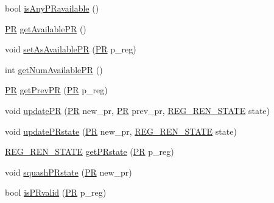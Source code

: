\begin{DoxyCompactItemize}
bool \hyperlink{classo3__registerRename_a500dec17b068c33a1813786cb6727273}{isAnyPRavailable} ()
\item 
\hyperlink{global_2global_8h_a54dcae2ba04c76c12afe113b706bd4dc}{PR} \hyperlink{classo3__registerRename_a314a54fa930b7fa3de55c8b66e46061b}{getAvailablePR} ()
\item 
void \hyperlink{classo3__registerRename_aae9d93d826236d42ba090d1d53ba62af}{setAsAvailablePR} (\hyperlink{global_2global_8h_a54dcae2ba04c76c12afe113b706bd4dc}{PR} p\_\-reg)
\item 
int \hyperlink{classo3__registerRename_af3dacac6db9095e6aa73da550e2c71bc}{getNumAvailablePR} ()
\item 
\hyperlink{global_2global_8h_a54dcae2ba04c76c12afe113b706bd4dc}{PR} \hyperlink{classo3__registerRename_ab76f162d8e2a6228404670bda2bad322}{getPrevPR} (\hyperlink{global_2global_8h_a54dcae2ba04c76c12afe113b706bd4dc}{PR} p\_\-reg)
\item 
void \hyperlink{classo3__registerRename_a6e6d2444676ba95b85d0a84908f6e5fe}{updatePR} (\hyperlink{global_2global_8h_a54dcae2ba04c76c12afe113b706bd4dc}{PR} new\_\-pr, \hyperlink{global_2global_8h_a54dcae2ba04c76c12afe113b706bd4dc}{PR} prev\_\-pr, \hyperlink{global_2global_8h_aa58e77d5a6caaeed4d4bd6f5b30f3ee7}{REG\_\-REN\_\-STATE} state)
\item 
void \hyperlink{classo3__registerRename_a6e6c35b5b477597e3eafed6def8c574b}{updatePRstate} (\hyperlink{global_2global_8h_a54dcae2ba04c76c12afe113b706bd4dc}{PR} new\_\-pr, \hyperlink{global_2global_8h_aa58e77d5a6caaeed4d4bd6f5b30f3ee7}{REG\_\-REN\_\-STATE} state)
\item 
\hyperlink{global_2global_8h_aa58e77d5a6caaeed4d4bd6f5b30f3ee7}{REG\_\-REN\_\-STATE} \hyperlink{classo3__registerRename_a62accbd82ef62f8c411975e824d644af}{getPRstate} (\hyperlink{global_2global_8h_a54dcae2ba04c76c12afe113b706bd4dc}{PR} p\_\-reg)
\item 
void \hyperlink{classo3__registerRename_aebbf6e056ef5e4c50081db9dc1817a2b}{squashPRstate} (\hyperlink{global_2global_8h_a54dcae2ba04c76c12afe113b706bd4dc}{PR} new\_\-pr)
\item 
bool \hyperlink{classo3__registerRename_a66e4f1bfb4aef291e88933aad6c46ce6}{isPRvalid} (\hyperlink{global_2global_8h_a54dcae2ba04c76c12afe113b706bd4dc}{PR} p\_\-reg)
\end{DoxyCompactItemize}


